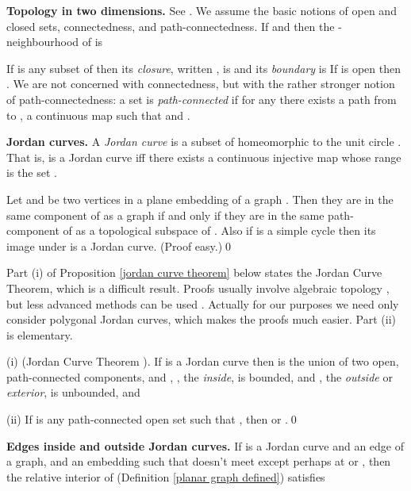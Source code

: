\numpara
\label{topology in two dimensions} {\bf Topology in two dimensions.} See \cite{moise,stillwell}.
We assume the basic notions
of open and closed sets, connectedness, and path-connectedness.
If  and  then the
-neighbourhood of  is

If  is any subset of  then
its {\em closure}, written , is
 and
its {\em boundary}  is
 If 
is open then . We
are not concerned with connectedness, but with the
rather stronger notion of path-connectedness:
a set 
is {\em path-connected} if for any 
there exists a path from  to , a continuous map 
such that  and .

\numpara
\label{Jordan curves} {\bf Jordan curves.} A {\em Jordan curve} is a subset of
 homeomorphic to the unit circle .
That is,  is a Jordan
curve iff there exists a continuous injective map 
whose range is the set .


\begin{proposition}
\label{path components in graph and plane} Let  and  be two vertices in a plane embedding  of
a graph .  Then they are in the same component
of  as a graph if and only if they are in
the same path-component of  as a topological
subspace of . Also if  is a simple cycle then
its image under
 is a Jordan curve.  (Proof easy.)\qed
\end{proposition}



Part (i) of Proposition \ref{jordan curve theorem} below
states the Jordan Curve Theorem, which is a difficult result.
Proofs usually involve
algebraic topology \cite{greenberg}, but less advanced
methods can be used
\cite{moise,stillwell}.
Actually for our purposes we need only consider polygonal
Jordan curves, which makes the proofs much easier.
Part (ii) is elementary.

\begin{proposition}
\label{jordan curve theorem} {\rm (i)} (Jordan Curve Theorem {\rm \cite{greenberg,moise,stillwell}}).
If  is a Jordan curve
then  is the union of two
open, path-connected components, 
 and ,
, the {\em inside}, is bounded, and , the {\em outside}
or {\em exterior},
is unbounded, and 

{\rm (ii)} If  is any path-connected open set such that
, then  or .\qed
\end{proposition}


\numpara
\label{edges inside and outside Jordan curves} {\bf Edges inside and outside Jordan curves.}
If  is a Jordan curve and  an edge of a
graph, and  an embedding such that  doesn't meet 
except perhaps at  or , then
the relative interior of  (Definition
\ref{planar graph defined}) satisfies


